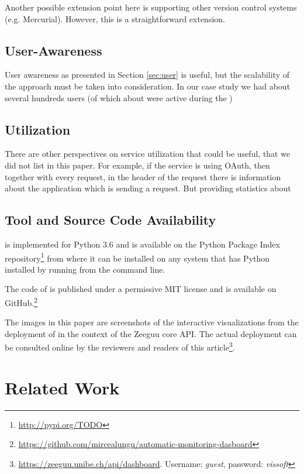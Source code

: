 \documentclass[conference]{IEEEtran}
\begin{document}
  Another possible extension point here is supporting other version control systems (e.g. Mercurial). However, this is a straightforward extension.



  \subsection{User-Awareness }

    User awareness as presented in Section \ref{sec:user} is useful, but the scalability of the approach must be taken into consideration. In our case study we had about several hundreds users (of which about \activeUserCount were active during the ) 


  \subsection{Utilization}

    There are other perspectives on service utilization that could be useful, that we did not list in this paper. For example, if the service is using OAuth, then together with every request, in the header of the request there is information about the application which is sending a request. But providing statistics about 

  \subsection{Tool and Source Code Availability}
  \label{sec:install}

    \tool is implemented for Python 3.6 and is available on the Python Package Index repository\footnote{\url{http://pypi.org/TODO}} from where it can be installed on any system that has Python installed by running \install from the command line. 

    The code of \tool is published under a permissive MIT license and is available on GitHub.\footnote{\url{https://github.com/mircealungu/automatic-monitoring-dasboard}}

    The images in this paper are screenshots of the interactive visualizations from the deployment of \tool in the context of the Zeeguu core API. The actual deployment can be consulted online by the reviewers and readers of this article\footnote{\url{https://zeeguu.unibe.ch/api/dashboard}. Username: {\em guest}, password: {\em vissoft}}.


\section{Related Work}
\label{sec:related}
\end{document}
